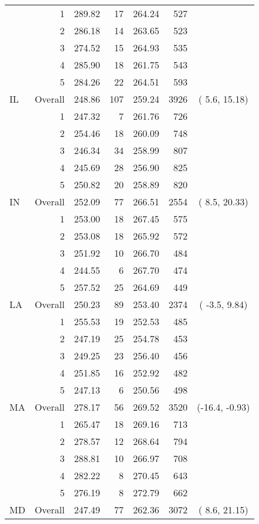 \begin{longtable}{lrrr@{\extracolsep{.25cm}}rrc}
   & 1 & 289.82 &  17 & 264.24 & 527 &  \\ 
   & 2 & 286.18 &  14 & 263.65 & 523 &  \\ 
   & 3 & 274.52 &  15 & 264.93 & 535 &  \\ 
   & 4 & 285.90 &  18 & 261.75 & 543 &  \\ 
   & 5 & 284.26 &  22 & 264.51 & 593 &  \\ 
   \hline
IL & Overall & 248.86 & 107 & 259.24 & 3926 & (  5.6,  15.18) \\ 
   & 1 & 247.32 &   7 & 261.76 & 726 &  \\ 
   & 2 & 254.46 &  18 & 260.09 & 748 &  \\ 
   & 3 & 246.34 &  34 & 258.99 & 807 &  \\ 
   & 4 & 245.69 &  28 & 256.90 & 825 &  \\ 
   & 5 & 250.82 &  20 & 258.89 & 820 &  \\ 
   \hline
IN & Overall & 252.09 &  77 & 266.51 & 2554 & (  8.5,  20.33) \\ 
   & 1 & 253.00 &  18 & 267.45 & 575 &  \\ 
   & 2 & 253.08 &  18 & 265.92 & 572 &  \\ 
   & 3 & 251.92 &  10 & 266.70 & 484 &  \\ 
   & 4 & 244.55 &   6 & 267.70 & 474 &  \\ 
   & 5 & 257.52 &  25 & 264.69 & 449 &  \\ 
   \hline
LA & Overall & 250.23 &  89 & 253.40 & 2374 & ( -3.5,   9.84) \\ 
   & 1 & 255.53 &  19 & 252.53 & 485 &  \\ 
   & 2 & 247.19 &  25 & 254.78 & 453 &  \\ 
   & 3 & 249.25 &  23 & 256.40 & 456 &  \\ 
   & 4 & 251.85 &  16 & 252.92 & 482 &  \\ 
   & 5 & 247.13 &   6 & 250.56 & 498 &  \\ 
   \hline
MA & Overall & 278.17 &  56 & 269.52 & 3520 & (-16.4,  -0.93) \\ 
   & 1 & 265.47 &  18 & 269.16 & 713 &  \\ 
   & 2 & 278.57 &  12 & 268.64 & 794 &  \\ 
   & 3 & 288.81 &  10 & 266.97 & 708 &  \\ 
   & 4 & 282.22 &   8 & 270.45 & 643 &  \\ 
   & 5 & 276.19 &   8 & 272.79 & 662 &  \\ 
   \hline
MD & Overall & 247.49 &  77 & 262.36 & 3072 & (  8.6,  21.15) \\ 

\end{longtable}
